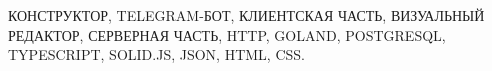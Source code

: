 
КОНСТРУКТОР,
TELEGRAM-БОТ,
КЛИЕНТСКАЯ ЧАСТЬ,
ВИЗУАЛЬНЫЙ РЕДАКТОР,
СЕРВЕРНАЯ ЧАСТЬ,
HTTP,
GOLAND,
POSTGRESQL,
TYPESCRIPT,
SOLID.JS,
JSON,
HTML,
CSS.


